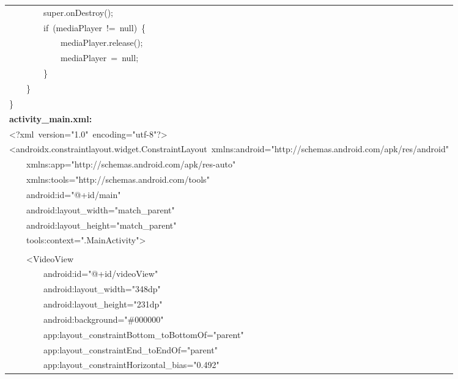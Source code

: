 \documentclass[a4paper,12pt]{article}
\begin{document}
\begin{longtable}{|p{}|}
{\ttfamily\small \ \ \ \ \ \ \ \ super.onDestroy();} \\
{\ttfamily\small \ \ \ \ \ \ \ \ if\ (mediaPlayer\ !=\ null)\ \{} \\
{\ttfamily\small \ \ \ \ \ \ \ \ \ \ \ \ mediaPlayer.release();} \\
{\ttfamily\small \ \ \ \ \ \ \ \ \ \ \ \ mediaPlayer\ =\ null;} \\
{\ttfamily\small \ \ \ \ \ \ \ \ \}} \\
{\ttfamily\small \ \ \ \ \}} \\
{\ttfamily\small \}} \\
\hline
\rule{0pt}{13pt}\textbf{activity\_main.xml:} \\
\hline
{\ttfamily\small \textless{}?xml\ version="1.0"\ encoding="utf-8"?\textgreater{}} \\
{\ttfamily\small \textless{}androidx.constraintlayout.widget.ConstraintLayout\ xmlns:android="http://schemas.android.com/apk/res/android"} \\
{\ttfamily\small \ \ \ \ xmlns:app="http://schemas.android.com/apk/res-auto"} \\
{\ttfamily\small \ \ \ \ xmlns:tools="http://schemas.android.com/tools"} \\
{\ttfamily\small \ \ \ \ android:id="@+id/main"} \\
{\ttfamily\small \ \ \ \ android:layout\_width="match\_parent"} \\
{\ttfamily\small \ \ \ \ android:layout\_height="match\_parent"} \\
{\ttfamily\small \ \ \ \ tools:context=".MainActivity"\textgreater{}} \\
\strut \\
{\ttfamily\small \ \ \ \ \textless{}VideoView} \\
{\ttfamily\small \ \ \ \ \ \ \ \ android:id="@+id/videoView"} \\
{\ttfamily\small \ \ \ \ \ \ \ \ android:layout\_width="348dp"} \\
{\ttfamily\small \ \ \ \ \ \ \ \ android:layout\_height="231dp"} \\
{\ttfamily\small \ \ \ \ \ \ \ \ android:background="\#000000"} \\
{\ttfamily\small \ \ \ \ \ \ \ \ app:layout\_constraintBottom\_toBottomOf="parent"} \\
{\ttfamily\small \ \ \ \ \ \ \ \ app:layout\_constraintEnd\_toEndOf="parent"} \\
{\ttfamily\small \ \ \ \ \ \ \ \ app:layout\_constraintHorizontal\_bias="0.492"} \\

\end{longtable}
\end{document}
